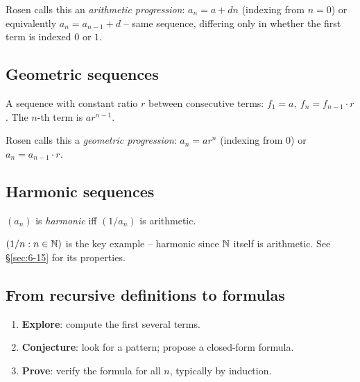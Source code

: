 \documentclass[11pt]{article}
\begin{document}
\begin{note}
Rosen calls this an \emph{arithmetic progression}: $a_n=a+dn$ (indexing from $n=0$) or equivalently $a_n=a_{n-1}+d$ -- same sequence, differing only in whether the first term is indexed $0$ or $1$.
\end{note}

\subsection{Geometric sequences}
\label{sec:6-4}

\begin{definition}
A sequence with constant ratio $r$ between consecutive terms: $f_1=a,\ f_n=f_{n-1}\cdot r$. The $n$-th term is $ar^{n-1}$.
\end{definition}

\begin{note}
Rosen calls this a \emph{geometric progression}: $a_n=ar^n$ (indexing from $0$) or $a_n=a_{n-1}\cdot r$.
\end{note}

\subsection{Harmonic sequences}
\label{sec:6-5}

\begin{definition}
$(a_n)$ is \emph{harmonic} iff $(1/a_n)$ is arithmetic.
\end{definition}

\begin{note}
$(1/n : n\in\mathbb{N})$ is the key example -- harmonic since $\mathbb{N}$ itself is arithmetic. See \S\ref{sec:6-15} for its properties.
\end{note}

\subsection{From recursive definitions to formulas}
\label{sec:6-6}

\begin{note}
\begin{enumerate}[label=\arabic*.]
    \item \textbf{Explore}: compute the first several terms.
    \item \textbf{Conjecture}: look for a pattern; propose a closed-form formula.
    \item \textbf{Prove}: verify the formula for all $n$, typically by induction.
\end{enumerate}
\end{note}
\end{document}
